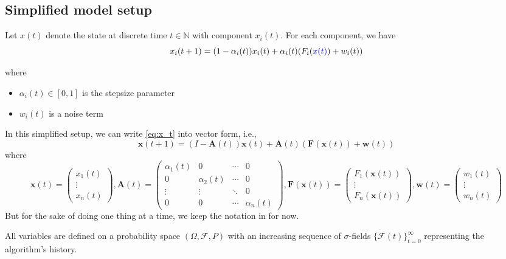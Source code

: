 \subsection{Simplified model setup}
Let $x(t)$ denote the state at discrete time $t\in\mathbb{N}$ with component $x_i(t)$. For each component, we have
\begin{equation}
    x_i(t+1) = (1-\alpha_i(t))x_i(t) + \alpha_i(t)(F_i(\textcolor{blue}{x(t)}) + w_i(t)) 
\end{equation}\label{eq:x_t}

where
\begin{itemize}
    \item $\alpha_i(t) \in [0,1]$ is the stepsize parameter
    \item $w_i(t)$ is a noise term
\end{itemize}
\begin{remark}
    In this simplified setup, we can write \autoref{eq:x_t} into vector form, i.e.,
    $$
    \mathbf{x}(t+1) =(I-\mathbf{A}(t)) \mathbf{x}(t) + \mathbf{A}(t)(\mathbf{F}(\mathbf{x}(t)) +\mathbf{w}(t))
    $$
    where
    $$
    \mathbf{x}(t) = \begin{pmatrix}
        x_1(t)\\
        \vdots\\
        x_n(t)
    \end{pmatrix},\mathbf{A}(t) = \begin{pmatrix}
        \alpha_1(t) & 0& \cdots & 0\\
        0& \alpha_2(t) & \cdots & 0\\
        \vdots & \vdots & \ddots & 0\\
        0 &0 &\cdots & \alpha_n(t)
    \end{pmatrix},\mathbf{F}(\mathbf{x}(t)) = \begin{pmatrix}
        F_1(\mathbf{x}(t))\\
        \vdots\\
        F_n(\mathbf{x}(t))
    \end{pmatrix},\mathbf{w}(t) = \begin{pmatrix}
        w_1(t)\\
        \vdots\\
        w_n(t)
    \end{pmatrix}
    $$
    But for the sake of doing one thing at a time, we keep the notation in \cite{tsitsiklis1994asynchronous} for now.
\end{remark}
All variables are defined on a probability space $(\Omega, \mathcal{F}, P)$ with an increasing sequence of $\sigma$-fields $\{\mathcal{F}(t)\}_{t=0}^{\infty}$ representing the algorithm's history. \\
